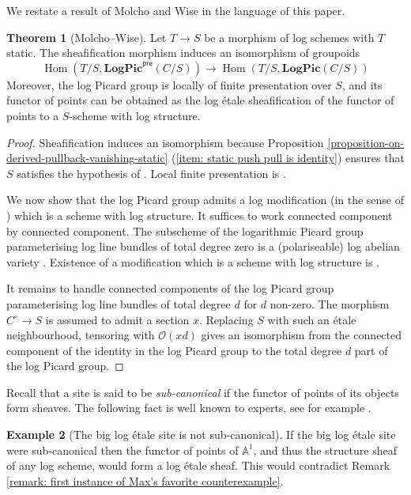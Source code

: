 \documentclass[11pt]{amsart}
\theoremstyle{definition}
\theoremstyle{definition}
\newtheorem{theorem}{Theorem}[subsection]
\newtheorem{example}[theorem]{Example}
\begin{document}
We restate a result of Molcho and Wise in the language of this paper.
\begin{theorem}[Molcho--Wise]\label{thm:MolchoWise}
    Let $T\rightarrow S$ be a morphism of log schemes with $T$ static. The sheafification morphism induces an isomorphism of groupoids 
    $$\operatorname{Hom}(T/S,\mathbf{LogPic}^\mathsf{pre}({C/S})) \longrightarrow \operatorname{Hom}(T/S,\mathbf{LogPic}({C/S}))$$
    Moreover, the log Picard group is locally of finite presentation over $S$, and its functor of points can be obtained as the log \'etale sheafification of the functor of points to a $S$-scheme with log structure.
\end{theorem}
\begin{proof}
    Sheafification induces an isomorphism because Proposition \ref{proposition-on-derived-pullback-vanishing-static} (\ref{item: static push pull is identity}) ensures that $S$ satisfies the hypothesis of \cite[Corollary 8.2]{molcho2023remarks}. Local finite presentation is \cite[Proposition~4.2.2]{MolchoWise}.

    We now show that the log Picard group admits a log modification (in the sense of \cite[Definition 2.2.6.1]{MolchoWise}) which is a scheme with log structure. It suffices to work connected component by connected component. The subscheme of the logarithmic Picard group parameterising log line bundles of total degree zero is a (polariseable) log abelian variety \cite[Corollary B]{MolchoWise}. Existence of a modification which is a scheme with log structure is \cite[Theorem 1.11]{KajiwaraKatoNakayama2018}. 
    
    It remains to handle connected components of the log Picard group parameterising log line bundles of total degree $d$ for $d$ non-zero. The morphism $C^\circ \rightarrow S$ is assumed to admit a section $x$. Replacing $S$ with such an \'etale neighbourhood, tensoring with $\mathcal{O}(xd)$ gives an isomorphism from the connected component of the identity in the log Picard group to the total degree $d$ part of the log Picard group. 
\end{proof}
Recall that a site is said to be \textit{sub-canonical} if the functor of points of its objects form sheaves. The following fact is well known to experts, see for example \cite{MolchoWise,molcho2023remarks}.

\begin{example}[The big log \'etale site is not sub-canonical]
    If the big log \'etale site were sub-canonical then the functor of points of $\mathbb{A}^1$, and thus the structure sheaf of any log scheme, would form a log \'etale sheaf. This would contradict Remark \ref{remark: first instance of Max's favorite counterexample}.
\end{example}
\end{document}
